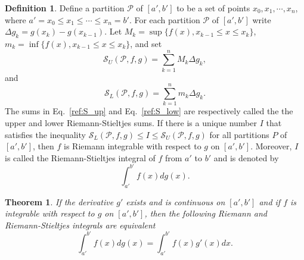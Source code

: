 \documentclass{article}
\theoremstyle{theorem}
\newtheorem{theorem}{Theorem}
\theoremstyle{definition}
\newtheorem*{definition}{Definition}
\begin{document}
\begin{definition}
Define a partition $\mathcal{P}$ of $[a',b']$ to be a set of points $x_0, x_1,\cdots,x_n$, 
where $a' = x_0 \leq x_1 \leq \cdots \leq x_n = b'$. For each partition 
$\mathcal{P}$ of $[a',b']$ write $\Delta g_k = g(x_k)-g(x_{k-1})$. Let 
$M_k = \sup\{f(x),x_{k-1}\leq x \leq x_{k}\}$, $m_k = \inf\{f(x),x_{k-1}\leq x \leq x_{k}\}$, and set 
\begin{equation}
\label{ref:S_up}
\mathcal{S}_U(\mathcal{P},f,g) = \sum_{k=1}^n M_k \Delta g_k, 
\end{equation}
and
\begin{equation}
\label{ref:S_low}
\mathcal{S}_L(\mathcal{P},f,g) = \sum_{k=1}^n m_k \Delta g_k. 
\end{equation}
The sums in Eq.~\eqref{ref:S_up} and Eq.~\eqref{ref:S_low} are respectively called the the upper and lower Riemann-Stieltjes sums.
If there is a unique number $I$ that satisfies the inequality $\mathcal{S}_L(\mathcal{P},f,g)\leq I \leq \mathcal{S}_U(\mathcal{P},f,g)$ for all 
partitions $P$ of $[a',b']$, then $f$ is Riemann integrable with respect to $g$ on $[a',b']$. Moreover, $I$ is called the Riemann-Stieltjes integral of $f$ from $a'$ to $b'$ and is denoted by
\begin{equation}
\int_{a'}^{b'} f(x) dg(x). 
\end{equation}
\end{definition}

\begin{theorem}
If the derivative $g'$ exists and is continuous on $[a',b']$ and if $f$ is integrable with respect to $g$ on $[a',b']$, then the following 
Riemann and Riemann-Stieltjes integrals are equivalent
\begin{equation}
\int_{a'}^{b'} f(x) dg(x) = \int_{a'}^{b'} f(x)g'(x)dx.
\end{equation}
\end{theorem}


\end{document}
